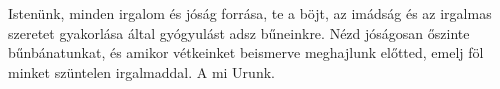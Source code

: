 \documentclass[twoside]{article}
\begin{document}

Istenünk, minden irgalom és jóság forrása, te a böjt, az imádság és az irgalmas szeretet %
gyakorlása által gyógyulást adsz bűneinkre. Nézd jóságosan őszinte bűnbánatunkat, és amikor %
vétkeinket beismerve meghajlunk előtted, emelj föl minket szüntelen irgalmaddal. A mi Urunk.

\end{document}
